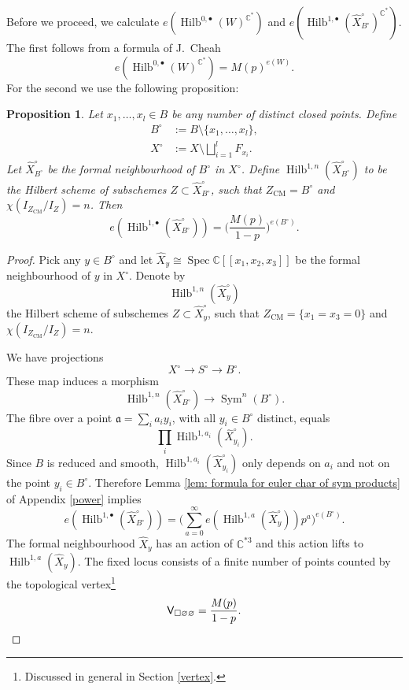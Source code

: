 \documentclass{amsart}
\newtheorem{proposition}[theorem]{Proposition}
\theoremstyle{definition}
\newcommand{\CC} {\mathbb{C}}          %
\newcommand{\sfV}{\mathsf{V}}
\newcommand{\Sym}{\operatorname{Sym}}
\newcommand{\Hilb}{\operatorname{Hilb}}
\newcommand{\CM}{\operatorname{CM}}
\newcommand{\Spec}{\operatorname{Spec}}
\newcommand{\Xhat}{\widehat{X}}
\begin{document}
Before we proceed, we calculate $e(\Hilb^{0,\bullet}(W)^{\CC^*})$ and $e(\Hilb^{1,\bullet}(\Xhat ^{\circ}_{B^{\circ}})^{\CC^*})$. The first follows from a formula of J.~Cheah \cite{Che} 
\begin{equation} \label{Cheah}
e(\Hilb^{0,\bullet}(W)^{\CC^*}) = M(p)^{e(W)}.
\end{equation}
For the second we use the following proposition:
\begin{proposition} \label{section}
Let $x_1, \ldots, x_l \in B$ be any number of distinct closed points. Define 
\begin{align*}
B^\circ &:= B \setminus \{x_1, \ldots, x_l\}, \\
X^\circ &:= X \setminus \bigsqcup_{i=1}^{l} F_{x_i}.
\end{align*} 
Let $\Xhat ^{\circ}_{B^{\circ}}$ be the formal neighbourhood of $B^\circ$ in $X^\circ$. Define $\Hilb^{1,n}(\Xhat ^{\circ}_{B^{\circ}})$ to be the Hilbert scheme of subschemes $Z \subset \Xhat ^{\circ}_{B^{\circ}}$, such that $Z_{\CM} = B^\circ$ and $\chi(I_{Z_{\CM}} / I_Z) = n$.
Then
$$
e(\Hilb^{1,\bullet}(\Xhat ^{\circ}_{B^{\circ}})) = \Bigg( \frac{M(p)}{1-p} \Bigg)^{e(B^\circ)}.
$$
\end{proposition}
\begin{proof}
Pick any $y \in B^\circ$ and let $\Xhat _{y} \cong \Spec \CC [\![x_1,x_2,x_3]\!]$ be the formal neighbourhood of $y$ in $X^\circ$. Denote by $$\Hilb^{1,n}(\Xhat ^{\circ}_{y})$$ the Hilbert scheme of subschemes $Z \subset \Xhat _{y}^{\circ}$, such that $Z_{\CM} = \{x_1=x_3=0\}$ and $\chi(I_{Z_{\CM}} / I_Z) = n$. 

We have projections
$$
X^\circ \longrightarrow S^\circ \longrightarrow B^\circ.
$$
These map induces a morphism
$$
\Hilb^{1,n}(\Xhat ^{\circ}_{B^{\circ}}) \longrightarrow \Sym^n(B^\circ).
$$
The fibre over a point $\mathfrak{a} = \sum_i a_i y_i$, with all $y_i \in B^\circ$ distinct, equals
$$
\prod_{i} \Hilb^{1,a_i}(\Xhat _{y_i}^{\circ}).
$$
Since $B$ is reduced and smooth, $\Hilb^{1,a_i}(\Xhat _{y_i}^{\circ})$ only depends on $a_i$ and not on the point $y_i \in B^\circ$. Therefore Lemma \ref{lem: formula for euler char of sym products} of Appendix \ref{power} implies
$$
e(\Hilb^{1,\bullet}(\Xhat ^{\circ}_{B^{\circ}})) = \Bigg( \sum_{a=0}^{\infty} e(\Hilb^{1,a}(\Xhat _{y}^{\circ})) p^a \Bigg)^{e(B^\circ)}.
$$
The formal neighbourhood $\Xhat _{y}$ has an action of $\CC^{*3}$ and this action lifts to $\Hilb^{1,a}(\Xhat _{y})$. The fixed locus consists of a finite number of points counted by the topological vertex\footnote{Discussed in general in Section \ref{vertex}.}
\begin{equation*}
\sfV_{\square\varnothing\varnothing} = \frac{M(p)}{1-p}. \qedhere
\end{equation*}
\end{proof}
\end{document}
